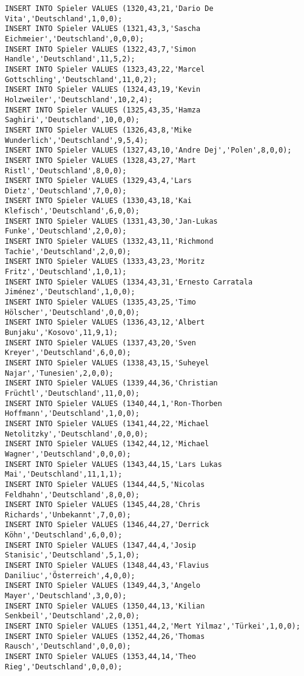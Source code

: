 \documentclass{bschlangaul-aufgabe}
\begin{document}
\begin{verbatim}
INSERT INTO Spieler VALUES (1320,43,21,'Dario De Vita','Deutschland',1,0,0);
INSERT INTO Spieler VALUES (1321,43,3,'Sascha Eichmeier','Deutschland',0,0,0);
INSERT INTO Spieler VALUES (1322,43,7,'Simon Handle','Deutschland',11,5,2);
INSERT INTO Spieler VALUES (1323,43,22,'Marcel Gottschling','Deutschland',11,0,2);
INSERT INTO Spieler VALUES (1324,43,19,'Kevin Holzweiler','Deutschland',10,2,4);
INSERT INTO Spieler VALUES (1325,43,35,'Hamza Saghiri','Deutschland',10,0,0);
INSERT INTO Spieler VALUES (1326,43,8,'Mike Wunderlich','Deutschland',9,5,4);
INSERT INTO Spieler VALUES (1327,43,10,'Andre Dej','Polen',8,0,0);
INSERT INTO Spieler VALUES (1328,43,27,'Mart Ristl','Deutschland',8,0,0);
INSERT INTO Spieler VALUES (1329,43,4,'Lars Dietz','Deutschland',7,0,0);
INSERT INTO Spieler VALUES (1330,43,18,'Kai Klefisch','Deutschland',6,0,0);
INSERT INTO Spieler VALUES (1331,43,30,'Jan-Lukas Funke','Deutschland',2,0,0);
INSERT INTO Spieler VALUES (1332,43,11,'Richmond Tachie','Deutschland',2,0,0);
INSERT INTO Spieler VALUES (1333,43,23,'Moritz Fritz','Deutschland',1,0,1);
INSERT INTO Spieler VALUES (1334,43,31,'Ernesto Carratala Jiménez','Deutschland',1,0,0);
INSERT INTO Spieler VALUES (1335,43,25,'Timo Hölscher','Deutschland',0,0,0);
INSERT INTO Spieler VALUES (1336,43,12,'Albert Bunjaku','Kosovo',11,9,1);
INSERT INTO Spieler VALUES (1337,43,20,'Sven Kreyer','Deutschland',6,0,0);
INSERT INTO Spieler VALUES (1338,43,15,'Suheyel Najar','Tunesien',2,0,0);
INSERT INTO Spieler VALUES (1339,44,36,'Christian Früchtl','Deutschland',11,0,0);
INSERT INTO Spieler VALUES (1340,44,1,'Ron-Thorben Hoffmann','Deutschland',1,0,0);
INSERT INTO Spieler VALUES (1341,44,22,'Michael Netolitzky','Deutschland',0,0,0);
INSERT INTO Spieler VALUES (1342,44,12,'Michael Wagner','Deutschland',0,0,0);
INSERT INTO Spieler VALUES (1343,44,15,'Lars Lukas Mai','Deutschland',11,1,1);
INSERT INTO Spieler VALUES (1344,44,5,'Nicolas Feldhahn','Deutschland',8,0,0);
INSERT INTO Spieler VALUES (1345,44,28,'Chris Richards','Unbekannt',7,0,0);
INSERT INTO Spieler VALUES (1346,44,27,'Derrick Köhn','Deutschland',6,0,0);
INSERT INTO Spieler VALUES (1347,44,4,'Josip Stanisic','Deutschland',5,1,0);
INSERT INTO Spieler VALUES (1348,44,43,'Flavius Daniliuc','Österreich',4,0,0);
INSERT INTO Spieler VALUES (1349,44,3,'Angelo Mayer','Deutschland',3,0,0);
INSERT INTO Spieler VALUES (1350,44,13,'Kilian Senkbeil','Deutschland',2,0,0);
INSERT INTO Spieler VALUES (1351,44,2,'Mert Yilmaz','Türkei',1,0,0);
INSERT INTO Spieler VALUES (1352,44,26,'Thomas Rausch','Deutschland',0,0,0);
INSERT INTO Spieler VALUES (1353,44,14,'Theo Rieg','Deutschland',0,0,0);

\end{verbatim}
\end{document}
